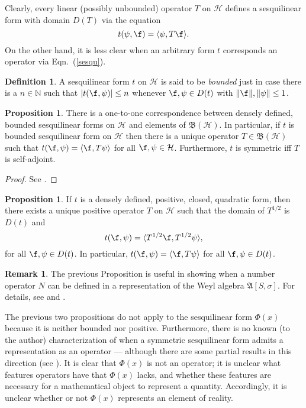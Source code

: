 \documentclass[12pt]{article}
\newcommand{\alg}[1]{\mathfrak{#1}}
\newcommand{\norm}[1]{\| #1\|}
\newcommand{\bh}{\mathfrak{B}(\mathcal{H})}
\newcommand{\abs}[1]{|#1|}
\theoremstyle{definition}
\newtheorem{prop}[thm]{Proposition}
\theoremstyle{definition}
\newtheorem{defn}[thm]{Definition}
\newtheorem{note}[thm]{Remark}
\theoremstyle{remark}
\def\2#1{{\mathcal #1}}
\def\7#1{{\mathbb #1}}
\begin{document}
Clearly, every linear (possibly unbounded) operator $T$ on $\2H$
defines a sesquilinear form with domain $D(T)$ via the equation
\begin{equation} t(\psi ,\f )=\langle \psi ,T\f \rangle .\label{sesqu}
\end{equation} On the other hand, it is less clear when an arbitrary
form $t$ corresponds an operator via Eqn.\ (\ref{sesqu}).  

\begin{defn} A sesquilinear form $t$ on $\2H$ is said to be
  \emph{bounded} just in case there is a $n \in \7N$ such that
  $\abs{t(\f ,\psi )}\leq n$ whenever $\f ,\psi \in D(t)$ with
  $\norm{\f },\norm{\psi }\leq 1$. \end{defn}

\begin{prop} There is a one-to-one correspondence between densely
  defined, bounded sesquilinear forms on $\2H$ and elements of $\bh$.
  In particular, if $t$ is bounded sesquilinear form on $\2H$ then
  there is a unique operator $T\in \bh$ such that $t(\f ,\psi)=\langle
  \f,T\psi \rangle$ for all $\f ,\psi \in \2H$.  Furthermore, $t$ is
  symmetric iff $T$ is self-adjoint.
\end{prop}

\begin{proof} See \cite[Theorem 2.4.1]{kr}.  \end{proof}

\begin{prop} If $t$ is a densely defined, positive, closed, quadratic
  form, then there exists a unique positive operator $T$ on $\2H$ such
  that the domain of $T^{1/2}$ is $D(t)$ and
$$ t(\f ,\psi )=\langle T^{1/2}\f ,T^{1/2}\psi \rangle ,$$
for all $\f ,\psi \in D(t)$.  In particular, $t(\f ,\psi )=\langle \f
,T\psi \rangle$ for all $\f ,\psi \in D(t)$.  \end{prop}

\begin{note} The previous Proposition is useful in showing when a
  number operator $N$ can be defined in a representation of the Weyl
  algebra $\alg{A}[S,\sigma ]$.  For details, see \cite{rindler} and
  \cite[p.\ 27]{brat2}. \end{note}

The previous two propositions do not apply to the sesquilinear form
$\Phi (x)$ because it is neither bounded nor positive.  Furthermore,
there is no known (to the author) characterization of when a symmetric
sesquilinear form admits a representation as an operator --- although
there are some partial results in this direction (see \cite{mcin}).
It is clear that $\Phi (x)$ is not an operator; it is unclear what
features operators have that $\Phi (x)$ lacks, and whether these
features are necessary for a mathematical object to represent a
quantity.  Accordingly, it is unclear whether or not $\Phi (x)$
represents an element of reality.
\end{document}
